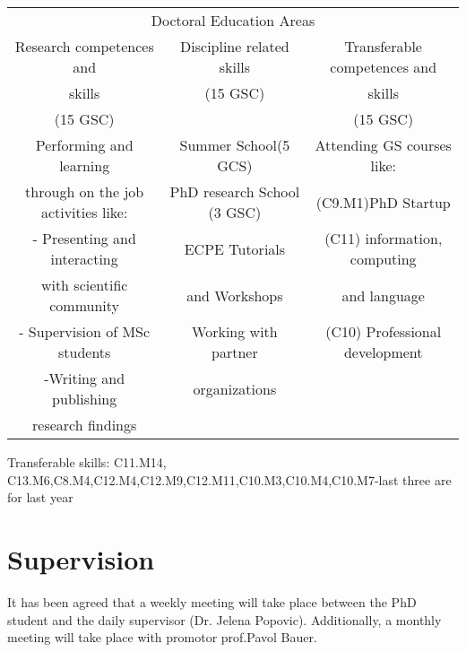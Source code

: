 \documentclass[]{scrreprt}
\begin{document}
\begin{table}[h!]
	\centering 
	\begin{adjustbox}{width=1\textwidth}
		\small
		\begin{tabular}{c c c} 
			\multicolumn{3}{c}{Doctoral Education Areas} \\ 
			\cmidrule(l){1-3}
			Research competences and  & Discipline related skills & Transferable competences and    \\ %
			skills & (15 GSC) & skills \\
			(15 GSC) &        & (15 GSC) \\
			\midrule %
			\midrule
		 Performing and learning  & Summer School(5 GCS) & Attending GS courses like: \\
		 through on the job activities like: & PhD research School (3 GSC) & (C9.M1)PhD Startup \\
		 - Presenting and interacting & ECPE Tutorials & (C11) information, computing \\
		 with scientific community & and Workshops & and language\\
		 - Supervision of MSc students & Working with partner &  (C10) Professional development  \\
		 -Writing and publishing & organizations  &  \\
		  research findings &  &  \\
			\bottomrule %
		\end{tabular}
	\end{adjustbox}
	\label{tab:template} %
\end{table}
Transferable skills: C11.M14, C13.M6,C8.M4,C12.M4,C12.M9,C12.M11,C10.M3,C10.M4,C10.M7-last three are for last year
\section{Supervision}
It has been agreed that a weekly meeting will take place between the PhD student and the daily supervisor (Dr. Jelena Popovic). Additionally, a monthly meeting will take place with promotor prof.Pavol Bauer.


	\newpage
	{}
	
	
\end{document}
